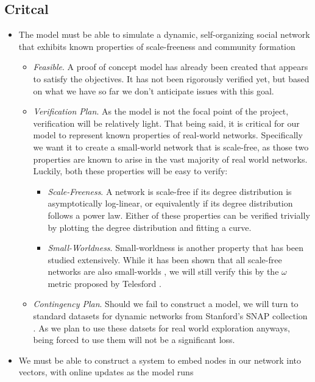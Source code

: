 \documentclass[10pt]{article}
\begin{document}
\subsection{Critcal}
\begin{itemize}
\item The model must be able to simulate a dynamic, self-organizing social network that exhibits known properties of scale-freeness and community formation
\begin{itemize}
\item \textit{Feasible}. A proof of concept model has already been created that appears to satisfy the objectives. It has not been rigorously verified yet, but based on what we have so far we don't anticipate issues with this goal. 
\item \textit{Verification Plan}. As the model is not the focal point of the project, verification will be relatively light. That being said, it is critical for our model to represent known properties of real-world networks. Specifically we want it to create a small-world network that is scale-free, as those two properties are known to arise in the vast majority of real world networks. Luckily, both these properties will be easy to verify: 
\begin{itemize}
\item \textit{Scale-Freeness}. A network is scale-free if its degree distribution is asymptotically log-linear, or equivalently if its degree distribution follows a power law. Either of these properties can be verified trivially by plotting the degree distribution and fitting a curve. 
\item \textit{Small-Worldness}. Small-worldness is another property that has been studied extensively. While it has been shown that all scale-free networks are also small-worlds \cite{cohen2003scale}, we will still verify this by the $\omega$ metric proposed by Telesford \cite{telesford2011ubiquity}. 
\end{itemize}
\item \textit{Contingency Plan}. Should we fail to construct a model, we will turn to standard datasets for dynamic networks from Stanford's SNAP collection \cite{snapnets}. As we plan to use these datsets for real world exploration anyways, being forced to use them will not be a significant loss. 
\end{itemize} 
\item We must be able to construct a system to embed nodes in our network into vectors, with online updates as the model runs
\begin{itemize}

\end{itemize}
\end{itemize}
\end{document}
